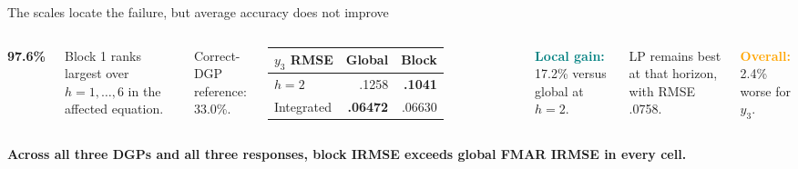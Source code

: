 \documentclass[aspectratio=169,11pt]{beamer}
\newcommand{\keypoint}[1]{\textcolor{Teal}{\textbf{#1}}}
\newcommand{\warning}[1]{\textcolor{Orange}{\textbf{#1}}}
\begin{document}
\begin{frame}{The scales locate the failure, but average accuracy does not improve}
\begin{columns}[T,onlytextwidth]
      {\fontsize{32}{35}\selectfont\color{Teal}\bfseries 97.6\%}\par
      {\fontsize{13.4}{16.5}\selectfont
       Block 1 ranks largest over $h=1,\ldots,6$ in the affected equation.\par
       \vspace{1.5mm}
       \color{MidGray}Correct-DGP reference: 33.0\%.}

      \vspace{5mm}
      {\fontsize{13.2}{16}\selectfont
      \begin{tabular}{@{}lrr@{}}
        \toprule
        $y_3$ RMSE & Global & Block \\
        \midrule
        $h=2$ & .1258 & \textbf{.1041} \\
        Integrated & \textbf{.06472} & .06630 \\
        \bottomrule
      \end{tabular}}

      \vspace{4mm}
      {\fontsize{13.4}{17}\selectfont
       \keypoint{Local gain:} 17.2\% versus global at $h=2$.\par
       {\fontsize{11.4}{14}\selectfont\color{MidGray}LP remains best at that horizon, with RMSE .0758.}\par
       \vspace{1mm}
       \warning{Overall:} 2.4\% worse for $y_3$.}
  \end{columns}

  \vspace{2mm}
  {\fontsize{12.4}{15}\selectfont\color{Orange}\bfseries
   Across all three DGPs and all three responses, block IRMSE exceeds global FMAR IRMSE in every cell.}
\end{frame}
\end{document}
